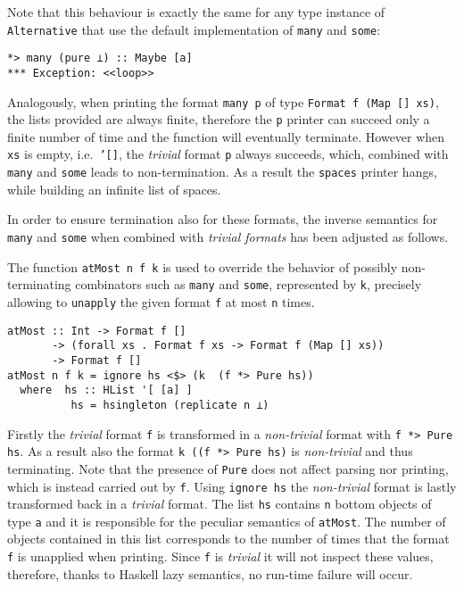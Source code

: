 \documentclass[../Thesis.tex]{subfiles}
\begin{document}
Note that this behaviour is exactly the same for any type
instance of \texttt{Alternative} that use the default implementation
of \texttt{many} and \texttt{some}:
\begin{verbatim}
*> many (pure ⊥) :: Maybe [a]
*** Exception: <<loop>>
\end{verbatim}

Analogously, when printing the format \texttt{many p} of type \texttt{Format f (Map [] xs)}, the lists provided are always finite, therefore the \texttt{p} printer can succeed only a finite number of time and the function will eventually terminate.
However when \texttt{xs} is empty, i.e.\ \texttt{'[]}, the \emph{trivial} format \texttt{p} always succeeds, which, combined with \texttt{many} and \texttt{some} leads to non-termination.
As a result the \texttt{spaces} printer hangs, while building an infinite list of spaces.

In order to ensure termination also for these formats, the inverse 
semantics for \texttt{many} and \texttt{some} when combined with \emph{trivial formats} has been adjusted as follows. 

The function \texttt{atMost n f k} is used to override the behavior of
possibly non-terminating combinators such as \texttt{many} and \texttt{some}, represented by \texttt{k}, precisely allowing to \texttt{unapply} the given format \texttt{f} at most \texttt{n} times.

\begin{verbatim}
atMost :: Int -> Format f [] 
       -> (forall xs . Format f xs -> Format f (Map [] xs))
       -> Format f []
atMost n f k = ignore hs <$> (k  (f *> Pure hs))
  where  hs :: HList '[ [a] ]    
          hs = hsingleton (replicate n ⊥)
\end{verbatim}

Firstly the \emph{trivial} format \texttt{f} is transformed in a \emph{non-trivial} format with \texttt{f *> Pure hs}. As a result also the format \texttt{k ((f *> Pure hs)} is \emph{non-trivial} and thus terminating.
Note that the presence of \texttt{Pure} does not affect parsing nor printing, which is instead carried out by \texttt{f}. Using \texttt{ignore hs} the \emph{non-trivial} format is lastly transformed back in a \emph{trivial} format.
The list \texttt{hs} contains \texttt{n} bottom objects of type \texttt{a} and it
is responsible for the peculiar semantics of \texttt{atMost}.
The number of objects contained in this list corresponds to the number of times that the format \texttt{f} is unapplied when printing. Since \texttt{f} is \emph{trivial} it will not inspect these values, therefore, thanks
to Haskell lazy semantics, no run-time failure will occur.
\end{document}
